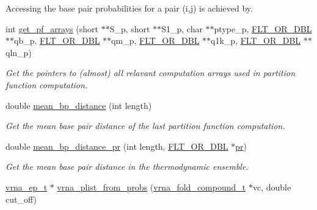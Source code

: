 \begin{DoxyCompactItemize}
\begin{DoxyCompactList}
Accessing the base pair probabilities for a pair (i,j) is achieved by. \end{DoxyCompactList}\item 
int \mbox{\hyperlink{group__pf__fold_ga42faebdfce6f070c5f89adfc8427525c}{get\+\_\+pf\+\_\+arrays}} (short $\ast$$\ast$S\+\_\+p, short $\ast$$\ast$S1\+\_\+p, char $\ast$$\ast$ptype\+\_\+p, \mbox{\hyperlink{group__data__structures_ga31125aeace516926bf7f251f759b6126}{F\+L\+T\+\_\+\+O\+R\+\_\+\+D\+BL}} $\ast$$\ast$qb\+\_\+p, \mbox{\hyperlink{group__data__structures_ga31125aeace516926bf7f251f759b6126}{F\+L\+T\+\_\+\+O\+R\+\_\+\+D\+BL}} $\ast$$\ast$qm\+\_\+p, \mbox{\hyperlink{group__data__structures_ga31125aeace516926bf7f251f759b6126}{F\+L\+T\+\_\+\+O\+R\+\_\+\+D\+BL}} $\ast$$\ast$q1k\+\_\+p, \mbox{\hyperlink{group__data__structures_ga31125aeace516926bf7f251f759b6126}{F\+L\+T\+\_\+\+O\+R\+\_\+\+D\+BL}} $\ast$$\ast$qln\+\_\+p)
\begin{DoxyCompactList}\small\item\em Get the pointers to (almost) all relavant computation arrays used in partition function computation. \end{DoxyCompactList}\item 
double \mbox{\hyperlink{group__pf__fold_ga79cbc375af65f11609feb6b055269e7d}{mean\+\_\+bp\+\_\+distance}} (int length)
\begin{DoxyCompactList}\small\item\em Get the mean base pair distance of the last partition function computation. \end{DoxyCompactList}\item 
double \mbox{\hyperlink{group__pf__fold_gad5ba36cef8d01cf4244cc09b9bf1ce1d}{mean\+\_\+bp\+\_\+distance\+\_\+pr}} (int length, \mbox{\hyperlink{group__data__structures_ga31125aeace516926bf7f251f759b6126}{F\+L\+T\+\_\+\+O\+R\+\_\+\+D\+BL}} $\ast$\mbox{\hyperlink{fold__vars_8h_ac98ec419070aee6831b44e5c700f090f}{pr}})
\begin{DoxyCompactList}\small\item\em Get the mean base pair distance in the thermodynamic ensemble. \end{DoxyCompactList}\item 
\mbox{\hyperlink{group__struct__utils_gab9ac98ab55ded9fb90043b024b915aca}{vrna\+\_\+ep\+\_\+t}} $\ast$ \mbox{\hyperlink{group__pf__fold_ga94f6efc0b8d8712b023452794a0a5bd2}{vrna\+\_\+plist\+\_\+from\+\_\+probs}} (\mbox{\hyperlink{group__fold__compound_ga1b0cef17fd40466cef5968eaeeff6166}{vrna\+\_\+fold\+\_\+compound\+\_\+t}} $\ast$vc, double cut\+\_\+off)
$$
\end{DoxyCompactItemize}
